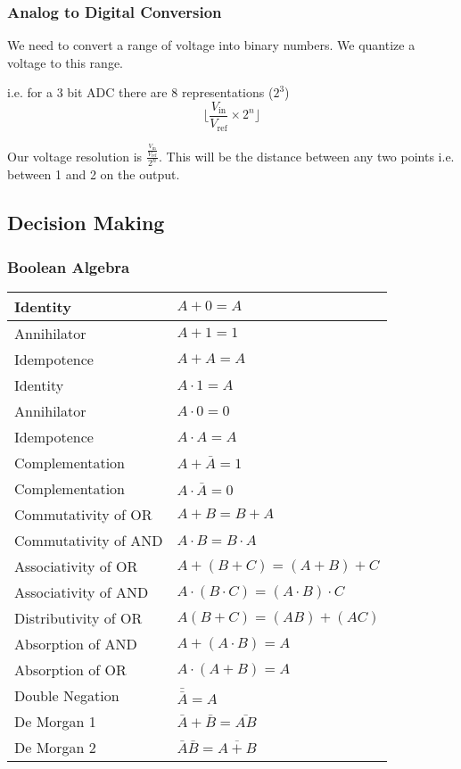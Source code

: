 \documentclass[12pt]{article}
\begin{document}
\subsubsection{Analog to Digital Conversion}
We need to convert a range of voltage into binary numbers. 
We quantize a voltage to this range. 

i.e. for a 3 bit ADC there are 8 representations ($2^3$)
\begin{equation*}
  \lfloor{\frac{V_\text{in}}{V_\text{ref}}\times 2^n}\rfloor{}
\end{equation*}

Our voltage resolution is $\frac{\frac{V_\text{in}}{V_\text{ref}}}{2^n}$. 
This will be the distance between any two points i.e. between 1 and 2 on the output. 

\subsection{Decision Making}
\subsubsection{Boolean Algebra}
\begin{table}[ht]
  \begin{tabular}{|m{4cm}|m{9cm}|}
    \hline
    Identity & $A + 0 = A$ \\
    \hline
    Annihilator &  $A + 1 = 1$ \\
    \hline
    Idempotence & $A+A=A$ \\
    \hline 
    Identity &  $A \cdot 1 = A$ \\
    \hline 
    Annihilator & $A \cdot 0 = 0$ \\
    \hline 
    Idempotence & $A \cdot A = A$ \\ 
    \hline 
    Complementation & $A + \bar{A} = 1$ \\
    \hline 
    Complementation & $A \cdot \bar{A} = 0$ \\
    \hline 
    Commutativity of OR & $A + B = B + A$ \\
    \hline
    Commutativity of AND & $A \cdot B = B \cdot A$ \\
    \hline 
    Associativity of OR & $A + (B + C) = (A + B) + C$ \\
    \hline
    Associativity of AND & $A \cdot (B \cdot C) = (A \cdot B) \cdot C$ \\
    \hline
    Distributivity of OR & $A(B+C) = (AB) + (AC)$ \\
    \hline 
    Absorption of AND & $A + (A \cdot B) = A$ \\
    \hline 
    Absorption of OR & $A \cdot (A + B) = A$ \\
    \hline 
    Double Negation &  $\bar{\bar{A}} = A$ \\
    \hline 
    De Morgan 1 & $\bar{A} + \bar{B} = \bar{AB}$ \\
    \hline
    De Morgan 2 & $\bar{A}\bar{B} = \overline{A+B}$ \\
    \hline
  \end{tabular}
\end{table}
\end{document}
